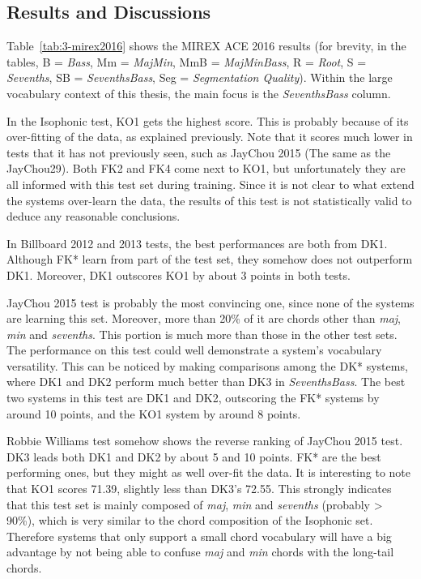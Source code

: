\subsection{Results and Discussions}
Table~\ref{tab:3-mirex2016} shows the MIREX ACE 2016 results (for brevity, in the tables, B = \textit{Bass}, Mm = \textit{MajMin}, MmB = \textit{MajMinBass}, R = \textit{Root}, S = \textit{Sevenths}, SB = \textit{SeventhsBass}, Seg = \textit{Segmentation Quality}). Within the large vocabulary context of this thesis, the main focus is the \textit{SeventhsBass} column.

In the Isophonic test, KO1 gets the highest score. This is probably because of its over-fitting of the data, as explained previously. Note that it scores much lower in tests that it has not previously seen, such as JayChou 2015 (The same as the JayChou29). Both FK2 and FK4 come next to KO1, but unfortunately they are all informed with this test set during training. Since it is not clear to what extend the systems over-learn the data, the results of this test is not statistically valid to deduce any reasonable conclusions.

In Billboard 2012 and 2013 tests, the best performances are both from DK1. Although FK* learn from part of the test set, they somehow does not outperform DK1. Moreover, DK1 outscores KO1 by about 3 points in both tests.

JayChou 2015 test is probably the most convincing one, since none of the systems are learning this set. Moreover, more than 20\% of it are chords other than \textit{maj}, \textit{min} and \textit{sevenths}. This portion is much more than those in the other test sets. The performance on this test could well demonstrate a system's vocabulary versatility. This can be noticed by making comparisons among the DK* systems, where DK1 and DK2 perform much better than DK3 in \textit{SeventhsBass}. The best two systems in this test are DK1 and DK2, outscoring the FK* systems by around 10 points, and the KO1 system by around 8 points.

Robbie Williams test somehow shows the reverse ranking of JayChou 2015 test. DK3 leads both DK1 and DK2 by about 5 and 10 points. FK* are the best performing ones, but they might as well over-fit the data. It is interesting to note that KO1 scores 71.39, slightly less than DK3's 72.55. This strongly indicates that this test set is mainly composed of \textit{maj}, \textit{min} and \textit{sevenths} (probably > 90\%), which is very similar to the chord composition of the Isophonic set. Therefore systems that only support a small chord vocabulary will have a big advantage by not being able to confuse \textit{maj} and \textit{min} chords with the long-tail chords.

